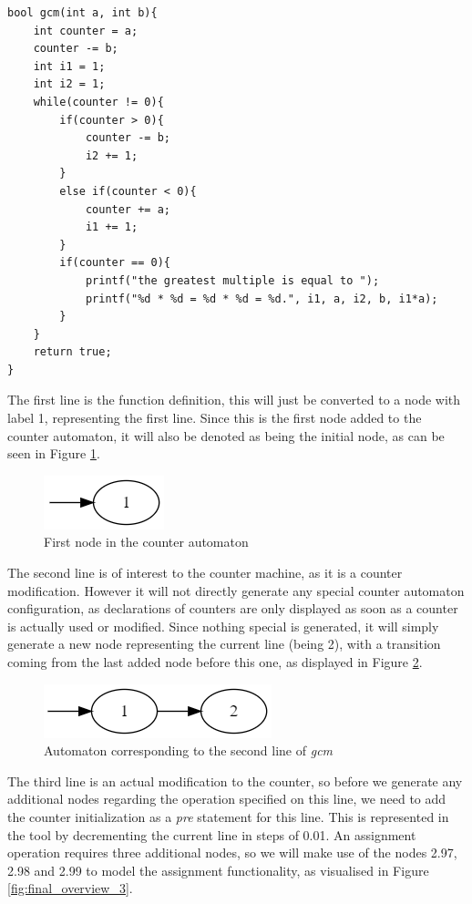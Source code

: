 \documentclass[12pt]{thesis}
\begin{document}
\begin{lstlisting}[style=CStyle, caption={Example of a more complex function suitable for conversion}, label={lst:final overview}]
bool gcm(int a, int b){
	int counter = a;
	counter -= b;
	int i1 = 1;
	int i2 = 1;
	while(counter != 0){
		if(counter > 0){
			counter -= b;
			i2 += 1;
		}
		else if(counter < 0){
			counter += a;
			i1 += 1;
		}
		if(counter == 0){
			printf("the greatest multiple is equal to ");
			printf("%d * %d = %d * %d = %d.", i1, a, i2, b, i1*a);
		}
	}
	return true;
}
\end{lstlisting}

The first line is the function definition, this will just be converted to a node with label 1, representing the first line. Since this is the first node added to the counter automaton, it will also be denoted as being the initial node, as can be seen in Figure \ref{fig:final_overview_1}.

\begin{figure}[h]
	\centering
	\includegraphics[width=0.2\linewidth]{final_overview_1}
	\caption{First node in the counter automaton}
	\label{fig:final_overview_1}
\end{figure}

The second line is of interest to the counter machine, as it is a counter modification. However it will not directly generate any special counter automaton configuration, as declarations of counters are only displayed as soon as a counter is actually used or modified. Since nothing special is generated, it will simply generate a new node representing the current line (being 2), with a transition coming from the last added node before this one, as displayed in Figure \ref{fig:final_overview_2}.

\begin{figure}[h]
	\centering
	\includegraphics[width=0.4\linewidth]{final_overview_2}
	\caption{Automaton corresponding to the second line of \textit{gcm}}
	\label{fig:final_overview_2}
\end{figure}

The third line is an actual modification to the counter, so before we generate any additional nodes regarding the operation specified on this line, we need to add the counter initialization as a \textit{pre} statement for this line. This is represented in the tool by decrementing the current line in steps of 0.01. An assignment operation requires three additional nodes, so we will make use of the nodes 2.97, 2.98 and 2.99 to model the assignment functionality, as visualised in Figure \ref{fig:final_overview_3}.
\end{document}
